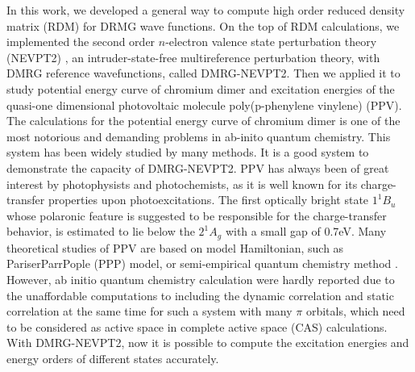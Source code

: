 In this work, we developed a general way to compute high order reduced density matrix (RDM) for DRMG wave functions. 
On the top of RDM calculations, we implemented the second order $n$-electron valence state perturbation theory (NEVPT2)
\cite{angeli_introduction_2001,angeli_n-electron_2001, angeli_n-electron_2002}, an intruder-state-free multireference perturbation theory, with DMRG reference wavefunctions, called DMRG-NEVPT2.
Then we applied it to study potential energy curve of chromium dimer and excitation energies of the quasi-one dimensional  photovoltaic molecule poly(p-phenylene vinylene) (PPV). 
The calculations for the potential energy curve of chromium dimer is one of the most notorious and demanding problems in ab-inito quantum chemistry. This system has been widely studied by many methods\cite{roos_ground_2003,celani_cipt2_2004,angeli_third-order_2006,muller_large-scale_2009,kurashige_second-order_2011,ruiperez_complete_2011,kurashige_multireference_2014,sharma_multireference_2015}. It is a good system to demonstrate the capacity of DMRG-NEVPT2. 
PPV has always been of great interest by photophysists and photochemists, as it is well known for its charge-transfer properties upon photoexcitations\cite{burroughes_light-emitting_1990,friend_electroluminescence_1999}. The first optically bright state $1^{1}B_{u}$ whose polaronic feature is suggested to be 
responsible for the charge-transfer behavior, is estimated to lie below the $2^{1}A_{g}$ with a small gap of 0.7eV\cite{martin_linear_1999}. 
Many theoretical studies of PPV are based on model Hamiltonian, such as  Pariser\textendash Parr\textendash Pople (PPP) model, \cite{shukla_correlated_2002, bursill_symmetry-adapted_2009} or semi-empirical quantum chemistry method \cite{beljonne_theoretical_1995}. However, ab initio quantum chemistry calculation were hardly reported due to the unaffordable computations to including the dynamic correlation and static correlation at the same time for such a system with many $\pi$ orbitals, which need to be considered as active space in complete active space (CAS) calculations.
With DMRG-NEVPT2, now it is possible to compute the excitation energies and energy orders of different states accurately.

